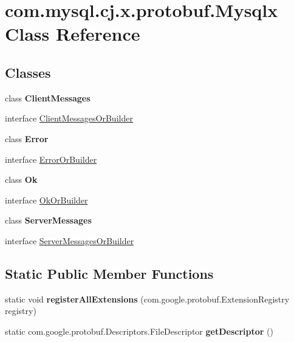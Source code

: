 \hypertarget{classcom_1_1mysql_1_1cj_1_1x_1_1protobuf_1_1_mysqlx}{}\section{com.\+mysql.\+cj.\+x.\+protobuf.\+Mysqlx Class Reference}
\label{classcom_1_1mysql_1_1cj_1_1x_1_1protobuf_1_1_mysqlx}
\subsection*{Classes}
\begin{DoxyCompactItemize}
\item 
class {\bfseries Client\+Messages}
\item 
interface \mbox{\hyperlink{interfacecom_1_1mysql_1_1cj_1_1x_1_1protobuf_1_1_mysqlx_1_1_client_messages_or_builder}{Client\+Messages\+Or\+Builder}}
\item 
class {\bfseries Error}
\item 
interface \mbox{\hyperlink{interfacecom_1_1mysql_1_1cj_1_1x_1_1protobuf_1_1_mysqlx_1_1_error_or_builder}{Error\+Or\+Builder}}
\item 
class {\bfseries Ok}
\item 
interface \mbox{\hyperlink{interfacecom_1_1mysql_1_1cj_1_1x_1_1protobuf_1_1_mysqlx_1_1_ok_or_builder}{Ok\+Or\+Builder}}
\item 
class {\bfseries Server\+Messages}
\item 
interface \mbox{\hyperlink{interfacecom_1_1mysql_1_1cj_1_1x_1_1protobuf_1_1_mysqlx_1_1_server_messages_or_builder}{Server\+Messages\+Or\+Builder}}
\end{DoxyCompactItemize}
\subsection*{Static Public Member Functions}
\begin{DoxyCompactItemize}
\item 
\mbox{\label{classcom_1_1mysql_1_1cj_1_1x_1_1protobuf_1_1_mysqlx_ac5ad1f10543bfb7df0d60b9cb208cc43}} 
static void {\bfseries register\+All\+Extensions} (com.\+google.\+protobuf.\+Extension\+Registry registry)
\item 
\mbox{\label{classcom_1_1mysql_1_1cj_1_1x_1_1protobuf_1_1_mysqlx_a5fc24d044e64d8e06e049b4a4bfae2f2}} 
static com.\+google.\+protobuf.\+Descriptors.\+File\+Descriptor {\bfseries get\+Descriptor} ()
\end{DoxyCompactItemize}
